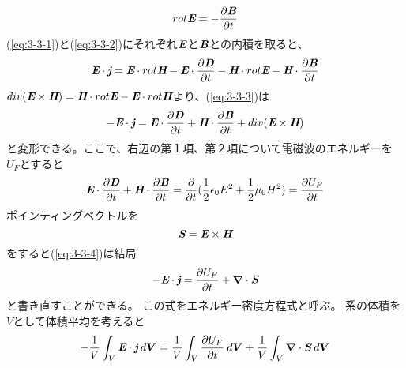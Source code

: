 \documentclass[a4paper,11pt,titlepage]{jsarticle}
\begin{document}
  \begin{equation}
    \label{eq:3-3-2}
    rot \textit{\textbf{E}} = - \frac{\partial \textit{\textbf{B}} }{\partial t} 
  \end{equation}
  (\ref{eq:3-3-1})と(\ref{eq:3-3-2})にそれぞれ$\textbf{\textit{E}}$と$\textbf{\textit{B}}$との内積を取ると、
  \begin{equation}
    \label{eq:3-3-3}
    \textit{\textbf{E}} \cdot \textit{\textbf{j}} = \textit{\textbf{E}} \cdot rot \textit{\textbf{H}} - 
    \textit{\textbf{E}} \cdot \frac{\partial \textit{\textbf{D}} }{\partial t} - \textit{\textbf{H}} \cdot rot \textit{\textbf{E}}
    - \textit{\textbf{H}} \cdot \frac{\partial \textit{\textbf{B}} }{\partial t}
  \end{equation}
  $div( \textit{\textbf{E}} \times \textit{\textbf{H}} ) = 
  \textit{\textbf{H}} \cdot rot \textit{\textbf{E}} -
  \textit{\textbf{E}} \cdot rot \textit{\textbf{H}} $より、(\ref{eq:3-3-3})は
  \begin{equation}
    \label{eq:3-3-4}
    - \textit{\textbf{E}} \cdot \textit{\textbf{j}} =  
    \textit{\textbf{E}} \cdot \frac{\partial \textit{\textbf{D}} }{\partial t} 
    + \textit{\textbf{H}} \cdot \frac{\partial \textit{\textbf{B}} }{\partial t}
    + div( \textit{\textbf{E}} \times \textit{\textbf{H}} )
  \end{equation}
  と変形できる。ここで、右辺の第１項、第２項について電磁波のエネルギーを$U_F$とすると
  \begin{equation}
    \label{eq:3-3-5}  
    \textit{\textbf{E}} \cdot \frac{\partial \textit{\textbf{D}} }{\partial t} 
    + \textit{\textbf{H}} \cdot \frac{\partial \textit{\textbf{B}} }{\partial t} =
    \frac{\partial}{\partial t } (\frac{1}{2}\epsilon_0 E^2 + \frac{1}{2} \mu_0 H^2) =
    \frac{\partial U_F }{\partial t } 
  \end{equation}
  ポインティングベクトルを
  \begin{equation}
    \label{eq:3-3-6}
    \textit{\textbf{S}} = \textit{\textbf{E}} \times \textit{\textbf{H}} 
  \end{equation}
  をすると(\ref{eq:3-3-4})は結局
  \begin{equation}
    \label{eq:3-3-7}
    - \textit{\textbf{E}} \cdot \textit{\textbf{j}} =  
    \frac{\partial U_F }{\partial t }    
    + \bm{\nabla} \cdot \textit{\textbf{S}} 
  \end{equation}
  と書き直すことができる。
  この式をエネルギー密度方程式と呼ぶ。
  系の体積を$V$として体積平均を考えると
  \begin{equation}
    \label{eq:3-3-8}
     - \frac{1}{V} \int_V \textit{\textbf{E}} \cdot \textit{\textbf{j}} \: d\bm{V} 
     = \frac{1}{V} \int_V \frac{\partial U_F }{\partial t } \: d\bm{V}
     + \frac{1}{V} \int_V \bm{\nabla} \cdot \textit{\textbf{S}} \: d\bm{V}
  \end{equation}
\end{document}
